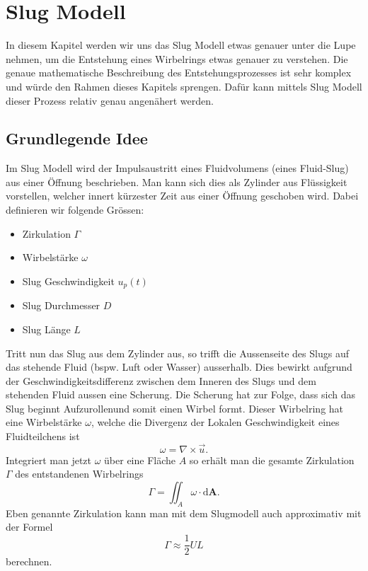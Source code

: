 %
%
%
\section{Slug Modell}
In diesem Kapitel werden wir uns das Slug Modell etwas genauer unter die Lupe nehmen, um die Entstehung eines Wirbelrings etwas genauer zu verstehen.
Die genaue mathematische Beschreibung des Entstehungsprozesses ist sehr komplex und würde den Rahmen dieses Kapitels sprengen.
Dafür kann mittels Slug Modell dieser Prozess relativ genau angenähert werden.

\subsection{Grundlegende Idee}
Im Slug Modell wird der Impulsaustritt eines Fluidvolumens (eines Fluid-Slug) aus einer Öffnung beschrieben.
Man kann sich dies als Zylinder aus Flüssigkeit vorstellen, welcher innert kürzester Zeit aus einer Öffnung geschoben wird.
Dabei definieren wir folgende Grössen:
\begin{itemize}
    \item Zirkulation $\Gamma$
    \item Wirbelstärke $\omega$
    \item Slug Geschwindigkeit $u_p(t)$
    \item Slug Durchmesser $D$
    \item Slug Länge $L$
\end{itemize}
Tritt nun das Slug aus dem Zylinder aus, so trifft die Aussenseite des Slugs auf das stehende Fluid (bspw. Luft oder Wasser) ausserhalb.
Dies bewirkt aufgrund der Geschwindigkeitsdifferenz zwischen dem Inneren des Slugs und dem stehenden Fluid aussen eine Scherung.
Die Scherung hat zur Folge, dass sich das Slug beginnt \glqq Aufzurollen\grqq und somit einen Wirbel formt. 
Dieser Wirbelring hat eine Wirbelstärke $\omega$, welche die Divergenz der Lokalen Geschwindigkeit eines Fluidteilchens ist
\[
\omega = \nabla \times \vec{u}.
\]
Integriert man jetzt $\omega$ über eine Fläche $A$ so erhält man die gesamte Zirkulation $\Gamma$ des entstandenen Wirbelrings
\[
\Gamma = \iint_{A} \omega\cdot\mathrm{d}\mathbf{A}.
\]
Eben genannte Zirkulation kann man mit dem Slugmodell auch approximativ mit der Formel
\[
\Gamma \approx \frac{1}{2}UL
\]
berechnen.